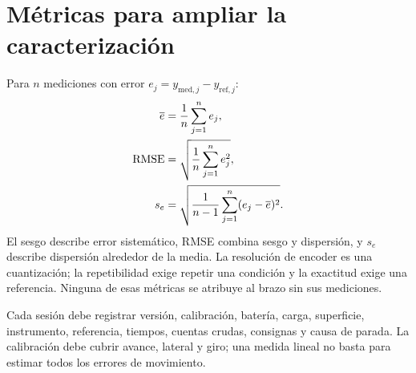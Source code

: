 \section{Métricas para ampliar la caracterización}
Para $n$ mediciones con error $e_j=y_{\mathrm{med},j}-y_{\mathrm{ref},j}$:
\begin{align}
\overline e&=\frac1n\sum_{j=1}^n e_j,\\
\operatorname{RMSE}&=\sqrt{\frac1n\sum_{j=1}^n e_j^2},\\
s_e&=\sqrt{\frac{1}{n-1}\sum_{j=1}^n(e_j-\overline e)^2}.
\end{align}
El sesgo describe error sistemático, RMSE combina sesgo y dispersión, y $s_e$ describe dispersión alrededor de la media. La resolución de encoder es una cuantización; la repetibilidad exige repetir una condición y la exactitud exige una referencia. Ninguna de esas métricas se atribuye al brazo sin sus mediciones.

Cada sesión debe registrar versión, calibración, batería, carga, superficie, instrumento, referencia, tiempos, cuentas crudas, consignas y causa de parada. La calibración debe cubrir avance, lateral y giro; una medida lineal no basta para estimar todos los errores de movimiento.
\FloatBarrier
